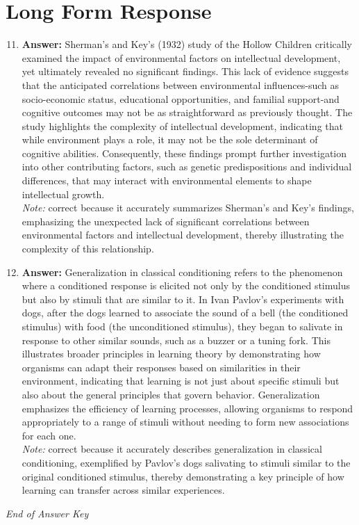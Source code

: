 \documentclass[12pt]{article}
\begin{document}
\section*{Long Form Response}
\begin{enumerate}[label=\arabic*.]
\setcounter{enumi}{10}
\item \textbf{Answer:} Sherman's and Key's (1932) study of the Hollow Children critically examined the impact of environmental factors on intellectual development, yet ultimately revealed no significant findings. This lack of evidence suggests that the anticipated correlations between environmental influences-such as socio-economic status, educational opportunities, and familial support-and cognitive outcomes may not be as straightforward as previously thought. The study highlights the complexity of intellectual development, indicating that while environment plays a role, it may not be the sole determinant of cognitive abilities. Consequently, these findings prompt further investigation into other contributing factors, such as genetic predispositions and individual differences, that may interact with environmental elements to shape intellectual growth.
\\ \textit{Note:} correct because it accurately summarizes Sherman's and Key's findings, emphasizing the unexpected lack of significant correlations between environmental factors and intellectual development, thereby illustrating the complexity of this relationship.
\item \textbf{Answer:} Generalization in classical conditioning refers to the phenomenon where a conditioned response is elicited not only by the conditioned stimulus but also by stimuli that are similar to it. In Ivan Pavlov's experiments with dogs, after the dogs learned to associate the sound of a bell (the conditioned stimulus) with food (the unconditioned stimulus), they began to salivate in response to other similar sounds, such as a buzzer or a tuning fork. This illustrates broader principles in learning theory by demonstrating how organisms can adapt their responses based on similarities in their environment, indicating that learning is not just about specific stimuli but also about the general principles that govern behavior. Generalization emphasizes the efficiency of learning processes, allowing organisms to respond appropriately to a range of stimuli without needing to form new associations for each one.
\\ \textit{Note:} correct because it accurately describes generalization in classical conditioning, exemplified by Pavlov's dogs salivating to stimuli similar to the original conditioned stimulus, thereby demonstrating a key principle of how learning can transfer across similar experiences.
\end{enumerate}

\vfill
\noindent\textit{End of Answer Key}
\end{document}
